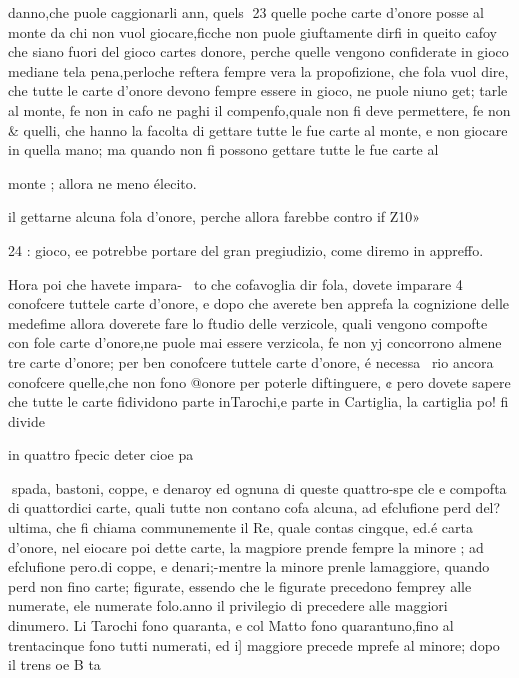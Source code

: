 \documentclass[11pt,a6paper]{article}
\begin{document}
danno,che puole caggionarli ann,
quels
23
quelle poche carte d’onore posse al monte da chi non vuol
giocare,ficche non puole giuftamente dirfi in queito cafoy che
siano fuori del gioco cartes
donore, perche quelle vengono confiderate in gioco mediane
tela pena,perloche reftera fempre vera la propofizione, che
fola vuol dire, che tutte le carte d’onore devono fempre essere in gioco, ne puole niuno get;
tarle al monte, fe non in cafo
ne paghi il compenfo,quale non
fi deve permettere, fe non &
quelli, che hanno la facolta di
gettare tutte le fue carte al
monte, e non giocare in quella
mano; ma quando non fi possono gettare tutte le fue carte al

monte ; allora ne meno élecito.

il gettarne alcuna fola d’onore,
perche allora farebbe contro if
Z10»

 

 
 

24 :
gioco, ee potrebbe portare del
gran pregiudizio, come diremo
in appreffo.

Hora poi che havete impara-~
to che cofavoglia dir fola, dovete imparare 4 conofcere tuttele carte d’onore, e dopo che
averete ben apprefa la cognizione delle medefime allora doverete fare lo ftudio delle verzicole, quali vengono compofte
con fole carte d’onore,ne puole
mai essere verzicola, fe non yj
concorrono almene tre carte
d’onore; per ben conofcere tuttele carte d’onore, é necessa~
rio ancora conofcere quelle,che
non fono @onore per poterle
diftinguere, ¢ pero dovete sapere che tutte le carte fidividono
parte inTarochi,e parte in Cartiglia, la cartiglia po! fi divide

in quattro fpecic deter cioe
pa
 
spada, bastoni, coppe, e denaroy
ed ognuna di queste quattro-spe cle e compofta di quattordici
carte, quali tutte non contano
cofa alcuna, ad efclufione perd
del? ultima, che fi chiama communemente il Re, quale contas
cingque, ed.é carta d’onore, nel
eiocare poi dette carte, la magpiore prende fempre la minore ;
ad efclufione pero.di coppe, e
denari;-mentre la minore prenle lamaggiore, quando perd non
fino carte; figurate, essendo che
le figurate precedono femprey
alle numerate, ele numerate
folo.anno il privilegio di precedere alle maggiori dinumero.
Li Tarochi fono quaranta, e
col Matto fono quarantuno,fino
al trentacinque fono tutti numerati, ed i] maggiore precede
mprefe al minore; dopo il trens
oe B ta 

 

 
\end{document}
